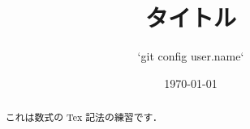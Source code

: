 \documentclass[uplatex]{jsarticle}
\title{タイトル}
\author{`git config user.name`}
\date{\today}
\theoremstyle{definition}
\begin{document}
\maketitle

\begin{abstract}
これは数式の Tex 記法の練習です．\cite{y.}
\end{abstract}

%

\printbibliography
\end{document}
